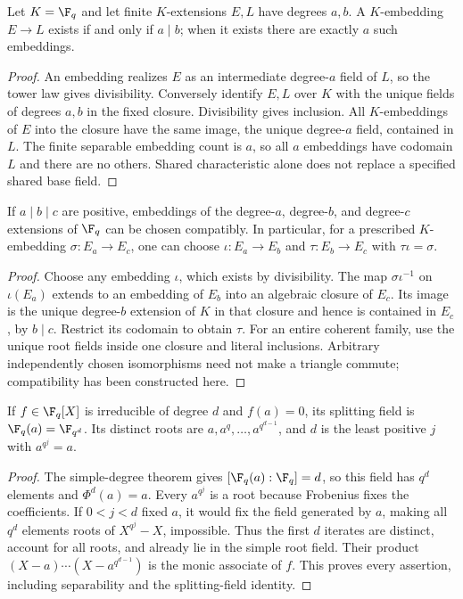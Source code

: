 \begin{theorem}
Let $K=\F_q$ and let finite $K$-extensions $E,L$ have degrees $a,b$. A $K$-embedding $E\to L$ exists if and only if $a\mid b$; when it exists there are exactly $a$ such embeddings.
\end{theorem}
\begin{proof}
An embedding realizes $E$ as an intermediate degree-$a$ field of $L$, so the tower law gives divisibility. Conversely identify $E,L$ over $K$ with the unique fields of degrees $a,b$ in the fixed closure. Divisibility gives inclusion. All $K$-embeddings of $E$ into the closure have the same image, the unique degree-$a$ field, contained in $L$. The finite separable embedding count is $a$, so all $a$ embeddings have codomain $L$ and there are no others. Shared characteristic alone does not replace a specified shared base field.
\end{proof}

\begin{proposition}
If $a\mid b\mid c$ are positive, embeddings of the degree-$a$, degree-$b$, and degree-$c$ extensions of $\F_q$ can be chosen compatibly. In particular, for a prescribed $K$-embedding $\sigma:E_a\to E_c$, one can choose $\iota:E_a\to E_b$ and $\tau:E_b\to E_c$ with $\tau\iota=\sigma$.
\end{proposition}
\begin{proof}
Choose any embedding $\iota$, which exists by divisibility. The map $\sigma\iota^{-1}$ on $\iota(E_a)$ extends to an embedding of $E_b$ into an algebraic closure of $E_c$. Its image is the unique degree-$b$ extension of $K$ in that closure and hence is contained in $E_c$, by $b\mid c$. Restrict its codomain to obtain $\tau$. For an entire coherent family, use the unique root fields inside one closure and literal inclusions. Arbitrary independently chosen isomorphisms need not make a triangle commute; compatibility has been constructed here.
\end{proof}

\begin{theorem}
If $f\in\F_q[X]$ is irreducible of degree $d$ and $f(a)=0$, its splitting field is $\F_q(a)=\F_{q^d}$. Its distinct roots are $a,a^q,\ldots,a^{q^{d-1}}$, and $d$ is the least positive $j$ with $a^{q^j}=a$.
\end{theorem}
\begin{proof}
The simple-degree theorem gives $[\F_q(a):\F_q]=d$, so this field has $q^d$ elements and $\Phi^d(a)=a$. Every $a^{q^j}$ is a root because Frobenius fixes the coefficients. If $0<j<d$ fixed $a$, it would fix the field generated by $a$, making all $q^d$ elements roots of $X^{q^j}-X$, impossible. Thus the first $d$ iterates are distinct, account for all roots, and already lie in the simple root field. Their product $(X-a)\cdots(X-a^{q^{d-1}})$ is the monic associate of $f$. This proves every assertion, including separability and the splitting-field identity.
\end{proof}

